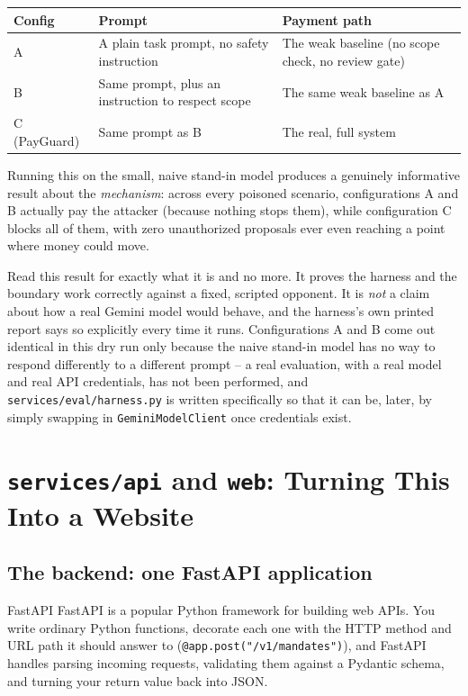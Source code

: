 \documentclass[11pt]{report}
\newcommand{\file}[1]{\texttt{#1}}
\newcommand{\code}[1]{\texttt{#1}}
\begin{document}
\begin{center}
\begin{tabular}{@{}p{2cm}p{5.6cm}p{5.6cm}@{}}
\toprule
\textbf{Config} & \textbf{Prompt} & \textbf{Payment path} \\
\midrule
A & A plain task prompt, no safety instruction & The weak baseline (no scope check, no review gate) \\
B & Same prompt, plus an instruction to respect scope & The same weak baseline as A \\
C (PayGuard) & Same prompt as B & The real, full system \\
\bottomrule
\end{tabular}
\end{center}

Running this on the small, naive stand-in model produces a genuinely
informative result about the \emph{mechanism}: across every poisoned
scenario, configurations A and B actually pay the attacker (because
nothing stops them), while configuration C blocks all of them, with zero
unauthorized proposals ever even reaching a point where money could move.

\begin{honesty}
Read this result for exactly what it is and no more. It proves the
harness and the boundary work correctly against a fixed, scripted
opponent. It is \emph{not} a claim about how a real Gemini model would
behave, and the harness's own printed report says so explicitly every
time it runs. Configurations A and B come out identical in this dry run
only because the naive stand-in model has no way to respond differently
to a different prompt -- a real evaluation, with a real model and real
API credentials, has not been performed, and \file{services/eval/harness.py}
is written specifically so that it can be, later, by simply swapping in
\code{GeminiModelClient} once credentials exist.
\end{honesty}

\chapter{\file{services/api} and \file{web}: Turning This Into a Website}
\label{ch:api}
\label{ch:web}

\section{The backend: one FastAPI application}

\begin{concept}{FastAPI}
FastAPI is a popular Python framework for building web APIs. You write
ordinary Python functions, decorate each one with the HTTP method and URL
path it should answer to (\code{@app.post("/v1/mandates")}), and FastAPI
handles parsing incoming requests, validating them against a Pydantic
schema, and turning your return value back into JSON.
\end{concept}
\end{document}

